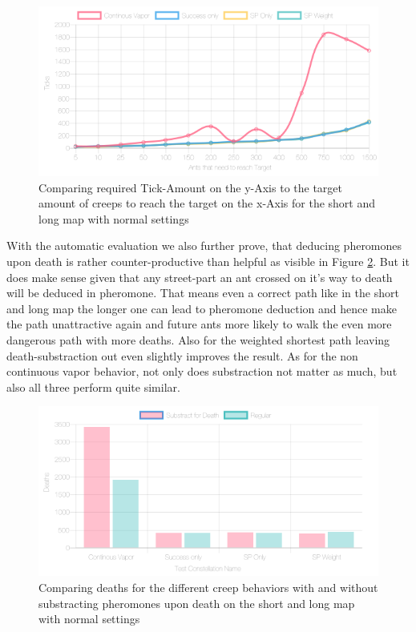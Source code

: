 \begin{figure}[H]
  \centering
  \includegraphics[width=1\linewidth]{images/normalshortandlongwithtowers-ticks-line}
  \caption{Comparing required Tick-Amount on the y-Axis to the target amount of creeps to reach the target on the x-Axis for the short and long map with normal settings}
  \label{fig:shortlongvaptick}
\end{figure}

With the automatic evaluation we also further prove, that deducing pheromones upon death is rather counter-productive than helpful as visible in Figure \ref{fig:deathsubshitty}. But it does make sense given that any street-part an ant crossed on it's way to death will be deduced in pheromone. That means even a correct path like in the short and long map the longer one can lead to pheromone deduction and hence make the path unattractive again and future ants more likely to walk the even more dangerous path with more deaths.
Also for the weighted shortest path leaving death-substraction out even slightly improves the result. As for the non continuous vapor behavior, not only does substraction not matter as much, but also all three perform quite similar.


\begin{figure}[H]
  \centering
  \includegraphics[width=1\linewidth]{images/normalshortandlongwithtowers-deaths}
  \caption{Comparing deaths for the different creep behaviors with and without substracting pheromones upon death on the short and long map with normal settings}
  \label{fig:deathsubshitty}
\end{figure}

